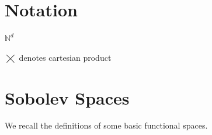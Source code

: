 \documentclass{article}
\newtheorem{prop}{Proposition}
\numberwithin{Def}{section}
\newcommand{\N}{\mathbb N}
\begin{document}


    
    

\newpage
\appendix
\section{Notation}
$\N^d$

$\bigtimes$ denotes cartesian product

\section{Sobolev Spaces}
We recall the definitions of some basic functional spaces. 
\end{document}
